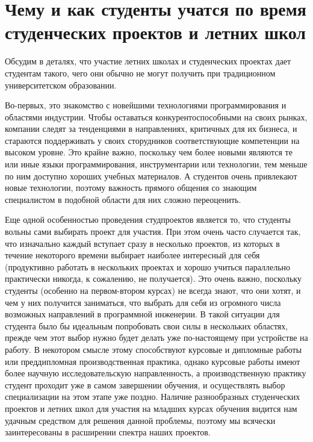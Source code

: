 \documentclass[a5paper]{article}
\begin{document}
\section{Чему и как студенты учатся по время студенческих проектов и летних школ}

Обсудим в деталях, что участие летних школах и студенческих проектах дает студентам такого, чего они обычно не могут получить при традиционном университетском образовании.

Во-первых, это знакомство с новейшими технологиями программирования и областями индустрии. Чтобы оставаться конкурентоспособными на своих рынках, компании следят за тенденциями в направлениях, критичных для их бизнеса, и стараются поддерживать у своих сторудников соответствующие компетенции на высоком уровне. Это крайне важно, поскольку чем более новыми являются те или иные языки программирования, инструментарии или технологии, тем меньше по ним доступно хороших учебных материалов. А студентов очень привлекают новые технологии, поэтому важность прямого общения со знающим специалистом в подобной области для них сложно переоценить.

Еще одной особенностью проведения студпроектов является то, что студенты вольны сами выбирать проект для участия. При этом очень часто случается так, что изначально каждый вступает сразу в несколько проектов, из которых в течение некоторого времени выбирает наиболее интересный для себя (продуктивно работать в нескольких проектах и хорошо учиться параллельно практически никогда, к сожалению, не получается). Это очень важно, поскольку студенты (особенно на первом-втором курсах) не всегда знают, что они хотят, и чем у них получится заниматься, что выбрать для себя из огромного числа возможных направлений в программной инженерии. В такой ситуации для студента было бы идеальным попробовать свои силы в нескольких областях, прежде чем этот выбор нужно будет делать уже по-настоящему при устройстве на работу. В некотором смысле этому способствуют курсовые и дипломные работы или преддипломная производственная практика, однако курсовые работы имеют более научную исследовательскую направленность, а производственную практику студент проходит уже в самом завершении обучения, и осуществлять выбор специализации на этом этапе уже поздно. Наличие разнообразных студенческих проектов и летних школ для участия на младших курсах обучения видится нам удачным средством для решения данной проблемы, поэтому мы всячески заинтересованы в расширении спектра наших проектов. 
\end{document}
